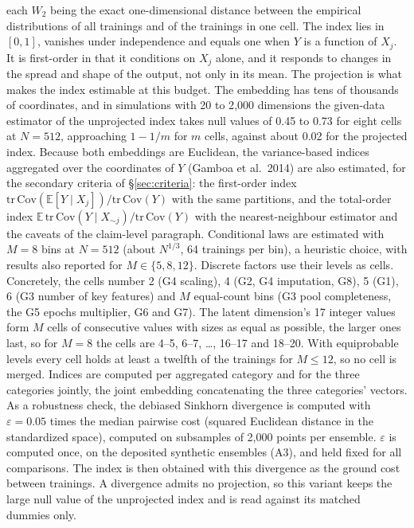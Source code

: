 \documentclass[11pt,a4paper]{article}
\begin{document}
each $W_2$ being the exact one-dimensional distance between the empirical
distributions of all trainings and of the trainings in one cell. The index
lies in $[0,1]$, vanishes under independence and equals one when $Y$ is a
function of $X_j$. It is first-order in that it conditions on $X_j$ alone,
and it responds to changes in the spread and shape of the output, not only
in its mean. The projection is what makes the index estimable at this
budget. The embedding has tens of thousands of coordinates, and in
simulations with 20 to 2{,}000 dimensions the given-data estimator of the
unprojected index takes null values of 0.45 to 0.73 for eight cells at
$N=512$, approaching $1-1/m$ for $m$ cells, against about 0.02 for the
projected index. Because
both embeddings are Euclidean, the variance-based indices aggregated over
the coordinates of $Y$ (Gamboa et al.\ 2014) are also estimated, for the
secondary criteria of \S\ref{sec:criteria}: the first-order index
$\mathrm{tr}\,\mathrm{Cov}(\mathbb{E}[Y\mid X_j])/\mathrm{tr}\,\mathrm{Cov}(Y)$
with the same partitions, and the total-order index
$\mathbb{E}\,\mathrm{tr}\,\mathrm{Cov}(Y\mid X_{\sim j})/\mathrm{tr}\,\mathrm{Cov}(Y)$
with the nearest-neighbour estimator and the caveats of the claim-level
paragraph.
Conditional laws are estimated with $M=8$ bins at $N=512$ (about
$N^{1/3}$, 64 trainings per bin), a heuristic choice, with results also
reported for $M\in\{5,8,12\}$. Discrete factors use their levels as cells.
Concretely, the cells number 2 (G4 scaling), 4 (G2, G4 imputation,
G8), 5 (G1), 6 (G3 number of key features) and $M$ equal-count bins (G3
pool completeness, the G5 epochs multiplier, G6 and G7). The latent
dimension's 17 integer values form $M$ cells of consecutive values with
sizes as equal as possible, the larger ones last, so for $M=8$ the cells
are 4--5, 6--7, \dots, 16--17 and 18--20. With equiprobable levels every
cell holds at least a twelfth of the trainings for $M\le 12$, so no cell
is merged. Indices are computed per aggregated category and for the
three categories jointly, the joint embedding concatenating the three
categories' vectors. As a robustness check, the debiased
Sinkhorn divergence is computed with $\varepsilon = 0.05$ times the median
pairwise cost (squared Euclidean distance in the standardized space),
computed on subsamples of 2{,}000 points per ensemble. $\varepsilon$ is
computed once, on the deposited synthetic ensembles (A3), and held fixed
for all comparisons. The index is then obtained with this divergence as
the ground cost between trainings. A divergence admits no projection, so
this variant keeps the large null value of the unprojected index and is
read against its matched dummies only.
\end{document}
